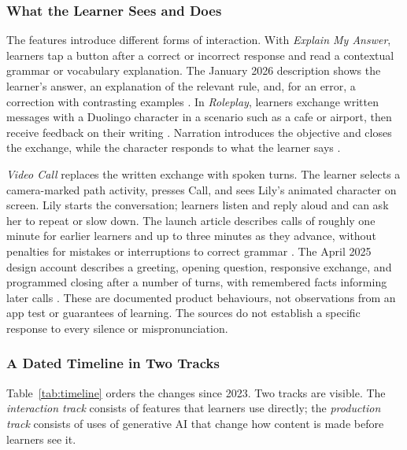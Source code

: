 \documentclass[11pt,titlepage]{article}
\begin{document}
\subsubsection{What the Learner Sees and Does}
The features introduce different forms of interaction. With \emph{Explain My Answer}, learners tap a button after a correct or incorrect response and read a contextual grammar or vocabulary explanation. The January 2026 description shows the learner's answer, an explanation of the relevant rule, and, for an error, a correction with contrasting examples \parencite{explainFree}. In \emph{Roleplay}, learners exchange written messages with a Duolingo character in a scenario such as a cafe or airport, then receive feedback on their writing \parencite{maxLaunch}. Narration introduces the objective and closes the exchange, while the character responds to what the learner says \parencite{roleplayDesign}.

\emph{Video Call} replaces the written exchange with spoken turns. The learner selects a camera-marked path activity, presses Call, and sees Lily's animated character on screen. Lily starts the conversation; learners listen and reply aloud and can ask her to repeat or slow down. The launch article describes calls of roughly one minute for earlier learners and up to three minutes as they advance, without penalties for mistakes or interruptions to correct grammar \parencite{videoCall}. The April 2025 design account describes a greeting, opening question, responsive exchange, and programmed closing after a number of turns, with remembered facts informing later calls \parencite{henry2025}. These are documented product behaviours, not observations from an app test or guarantees of learning. The sources do not establish a specific response to every silence or mispronunciation.

\subsubsection{A Dated Timeline in Two Tracks}
Table~\ref{tab:timeline} orders the changes since 2023. Two tracks are visible. The \emph{interaction track} consists of features that learners use directly; the \emph{production track} consists of uses of generative AI that change how content is made before learners see it.
\end{document}
